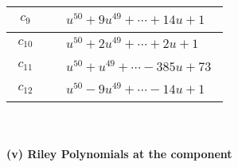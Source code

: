 \documentclass[1p]{elsarticle_modified}
\theoremstyle{definition}
\begin{document}
\begin{tabular}{m{50pt}|m{274pt}}
\hline $$\begin{aligned}c_{9}\end{aligned}$$&$\begin{aligned}
&u^{50}+9 u^{49}+\cdots+14 u+1
\end{aligned}$\\
\hline $$\begin{aligned}c_{10}\end{aligned}$$&$\begin{aligned}
&u^{50}+2 u^{49}+\cdots+2 u+1
\end{aligned}$\\
\hline $$\begin{aligned}c_{11}\end{aligned}$$&$\begin{aligned}
&u^{50}+u^{49}+\cdots-385 u+73
\end{aligned}$\\
\hline $$\begin{aligned}c_{12}\end{aligned}$$&$\begin{aligned}
&u^{50}-9 u^{49}+\cdots-14 u+1
\end{aligned}$\\
\hline
\end{tabular}\\~\\
\newpage\renewcommand{\arraystretch}{1}
\flushleft \textbf{(v) Riley Polynomials at the component}\newline \\
\end{document}
